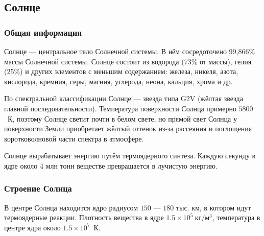 \subsection{Солнце}
\subsubsection*{Общая информация}

Солнце --- центральное тело Солнечной системы. В нём сосредоточено 99,866\%  массы Солнечной системы. Солнце состоит из водорода (73\% от массы), гелия (25\%) и других элементов с меньшим содержанием: железа, никеля, азота, кислорода, кремния, серы, магния, углерода, неона, кальция, хрома и др.

По спектральной классификации Солнце --- звезда типа G2V (жёлтая звезда главной последовательности). Температура поверхности Солнца  примерно $5 800$~К, поэтому Солнце светит почти в белом свете, но прямой свет Солнца у поверхности Земли приобретает жёлтый оттенок из-за рассеяния и поглощения коротковолновой части спектра в атмосфере.

Солнце вырабатывает энергию путём термоядерного синтеза. Каждую секунду в ядре около 4 млн тонн веществе превращается в лучистую энергию.

\subsubsection*{Строение Солнца}

В центре Солнца находится ядро радиусом $150$ --- $180$ тыс. км, в котором идут термоядерные реакции. Плотность  вещества в ядре $1.5\times 10^5~\text{кг}/\text{м}^3$, температура в центре ядра около $1.5\times 10^7$~К.